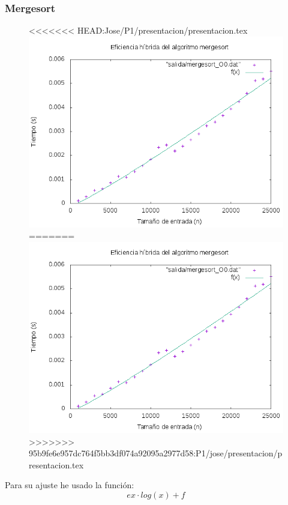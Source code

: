 \documentclass[spanish]{beamer}
\begin{document}
 \begin{frame}\frametitle{Mergesort}
    \begin{figure}[H]
    \centering   
<<<<<<< HEAD:Jose/P1/presentacion/presentacion.tex
    \includegraphics[clip,width=0.6\columnwidth]{../plots/mergesort_O0_fit.png}%
=======
    \includegraphics[clip,width=0.76\columnwidth]{../plots/mergesort_O0_fit.png}%
>>>>>>> 95b9fe6e957dc764f5bb3df074a92095a2977d58:P1/jose/presentacion/presentacion.tex
    \end{figure}

    Para su ajuste he usado la función: $$ex\cdot log(x)+f$$
       
  \end{frame}
\end{document}
